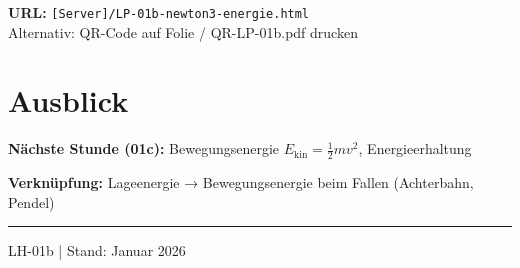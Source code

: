 \documentclass[11pt, a4paper]{article}
\begin{document}
\begin{infobox}[LP-Zugang]
\textbf{URL:} \texttt{[Server]/LP-01b-newton3-energie.html}\\
Alternativ: QR-Code auf Folie / QR-LP-01b.pdf drucken
\end{infobox}


\section*{Ausblick}

\textbf{Nächste Stunde (01c):} Bewegungsenergie $E_\text{kin} = \frac{1}{2} m v^2$, Energieerhaltung

\textbf{Verknüpfung:} Lageenergie → Bewegungsenergie beim Fallen (Achterbahn, Pendel)

\vfill
\hrule
\vspace{0.3em}
\begin{center}
\small\textcolor{mittelgrau}{LH-01b | Stand: Januar 2026}
\end{center}
\end{document}
